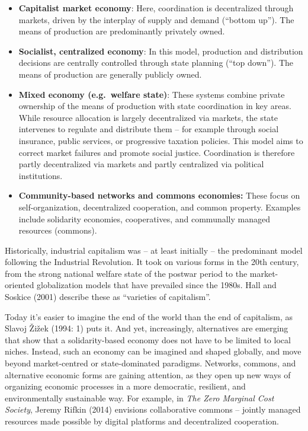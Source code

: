 \documentclass[
  a4paper,
  openany]{book}
\begin{document}
\begin{itemize}
\item
  \textbf{Capitalist market economy}: Here, coordination is
  decentralized through markets, driven by the interplay of supply and
  demand (``bottom up''). The means of production are predominantly
  privately owned.
\item
  \textbf{Socialist, centralized economy}: In this model, production and
  distribution decisions are centrally controlled through state planning
  (``top down''). The means of production are generally publicly owned.
\item
  \textbf{Mixed economy (e.g.~welfare state)}: These systems combine
  private ownership of the means of production with state coordination
  in key areas. While resource allocation is largely decentralized via
  markets, the state intervenes to regulate and distribute them -- for
  example through social insurance, public services, or progressive
  taxation policies. This model aims to correct market failures and
  promote social justice. Coordination is therefore partly decentralized
  via markets and partly centralized via political institutions.
\item
  \textbf{Community-based networks and commons economies:} These focus
  on self-organization, decentralized cooperation, and common property.
  Examples include solidarity economies, cooperatives, and communally
  managed resources (commons).
\end{itemize}

Historically, industrial capitalism was -- at least initially -- the
predominant model following the Industrial Revolution. It took on
various forms in the 20th century, from the strong national welfare
state of the postwar period to the market-oriented globalization models
that have prevailed since the 1980s. Hall and Soskice (2001) describe
these as ``varieties of capitalism''.

Today it's easier to imagine the end of the world than the end of
capitalism, as Slavoj Žižek (1994: 1) puts it. And yet, increasingly,
alternatives are emerging that show that a solidarity-based economy does
not have to be limited to local niches. Instead, such an economy can be
imagined and shaped globally, and move beyond market-centred or
state-dominated paradigms. Networks, commons, and alternative economic
forms are gaining attention, as they open up new ways of organizing
economic processes in a more democratic, resilient, and environmentally
sustainable way. For example, in \emph{The Zero Marginal Cost Society},
Jeremy Rifkin (2014) envisions collaborative commons -- jointly managed
resources made possible by digital platforms and decentralized
cooperation.
\end{document}
